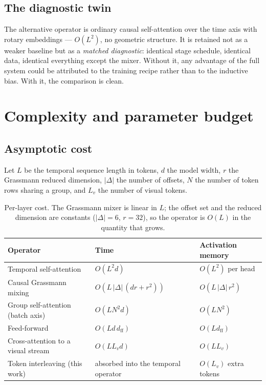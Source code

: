 \subsection{The diagnostic twin}

The alternative operator is ordinary causal self-attention over the time axis with rotary
embeddings --- $O(L^2)$, no geometric structure. It is retained not as a weaker baseline but
as a \emph{matched diagnostic}: identical stage schedule, identical data, identical
everything except the mixer. Without it, any advantage of the full system could be attributed
to the training recipe rather than to the inductive bias. With it, the comparison is clean.

\section{Complexity and parameter budget}
\label{sec:complexity}

\subsection{Asymptotic cost}

Let $L$ be the temporal sequence length in tokens, $d$ the model width, $r$ the Grassmann
reduced dimension, $|\Delta|$ the number of offsets, $N$ the number of token rows sharing a
group, and $L_v$ the number of visual tokens.

\begin{table}[h!]
\centering
\small
\begin{tabular}{l l l}
\hline
\textbf{Operator} & \textbf{Time} & \textbf{Activation memory} \\
\hline
Temporal self-attention & $O(L^2 d)$ & $O(L^2)$ per head \\
Causal Grassmann mixing & $O\!\left(L\,|\Delta|\,(dr + r^2)\right)$ &
$O(L\,|\Delta|\,r^2)$ \\
Group self-attention (batch axis) & $O(L N^2 d)$ & $O(L N^2)$ \\
Feed-forward & $O(L d\, d_{\text{ff}})$ & $O(L d_{\text{ff}})$ \\
\hline
Cross-attention to a visual stream & $O(L L_v d)$ & $O(L L_v)$ \\
Token interleaving (this work) & absorbed into the temporal operator & $O(L_v)$ extra
tokens \\
\hline
\end{tabular}
\caption{Per-layer cost. The Grassmann mixer is linear in $L$; the offset set and the reduced
dimension are constants ($|\Delta|=6$, $r=32$), so the operator is $O(L)$ in the quantity
that grows.}
\label{tab:complexity}
\end{table}

